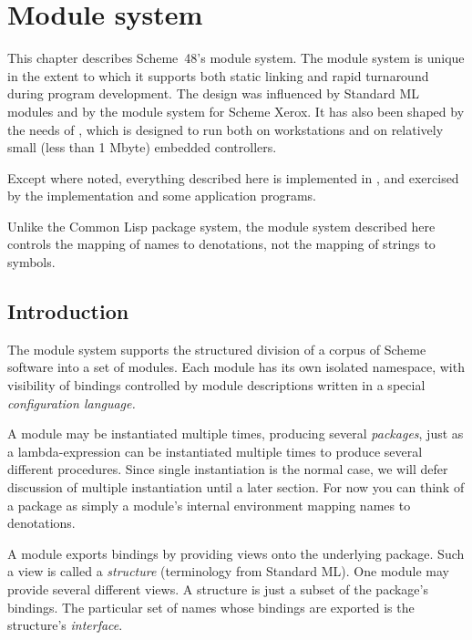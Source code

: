 

\chapter{Module system}
\label{chapter:modules}

This chapter describes Scheme~48's module system.
The module system is unique in the extent to which it
supports both static linking and rapid turnaround during program
development.  The design was influenced by Standard ML
modules\cite{MacQueen:Modules} and by the module system for Scheme
Xerox\cite{Curtis-Rauen:Modules}.  It has also been shaped by the
needs of \hack{}, which is designed to run both on workstations and
on relatively small (less than 1 Mbyte) embedded controllers.

Except where noted, everything described here is implemented in
\hack{}, and exercised by the \hack{} implementation and some
application programs.

Unlike the Common Lisp package system, the module system described
here controls the mapping of names to denotations, not the
mapping of strings to symbols.

\section{Introduction}

The module system supports the structured division of a corpus of
Scheme software into a set of modules.  Each module has its own
isolated namespace, with visibility of bindings controlled by module
descriptions written in a special {\em configuration language.}

A module may be instantiated multiple times, producing several {\em
packages}, just as a lambda-expression can be instantiated multiple
times to produce several different procedures.  Since single
instantiation is the normal case, we will defer discussion of multiple
instantiation until a later section.  For now you can think of a
package as simply a module's internal environment mapping names to
denotations.

A module exports bindings by providing views onto the underlying
package.  Such a view is called a {\em structure} (terminology from
Standard ML).  One module may provide several different views.  A
structure is just a subset of the package's bindings.  The particular
set of names whose bindings are exported is the structure's {\em
interface}.


